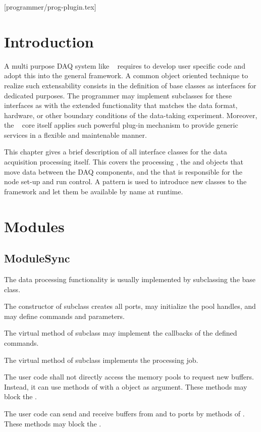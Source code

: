 [programmer/prog-plugin.tex]
\section{Introduction}
A multi purpose DAQ system like \dabc~ requires to develop user specific code and adopt
this into the general framework. A common object oriented technique to realize such
extensability consists in the definition of base classes as interfaces for dedicated purposes.
The programmer may implement subclasses for these interfaces as 
with the extended functionality that matches the data format, hardware, or other boundary conditions of the
data-taking experiment. Moreover, the  \dabc~ core itself applies such powerful plug-in mechanism to provide generic services in a flexible and maintenable manner.   

This chapter gives a brief description of all interface classes for the data acquisition 
processing itself. This covers the processing , the  and 
 objects that move data between the DAQ components, 
and the  that is responsible for the node set-up and run control.
A  pattern is used to introduce new classes to the framework and let them
be available by name at runtime.

\section{Modules}
\subsection{ModuleSync}
The data processing functionality is usually implemented by subclassing 
   the  base class. 

\begin{compactenum}
\item  The constructor of  subclass  creates all 
      ports, may initialize the pool handles, and may 
      define commands and parameters. 
\item  The virtual  method of  
      subclass may implement the callbacks of the defined commands.
\item  The virtual  method of  
      subclass implements the processing job.
\item  The user code shall not directly access the 
      memory pools to request new buffers. Instead, it can use methods of 
       with a  object as argument. 
      These methods may block the .
\item  The user code can send and receive buffers 
      from and to ports by methods of . 
      These methods may block the .
\end{compactenum}

